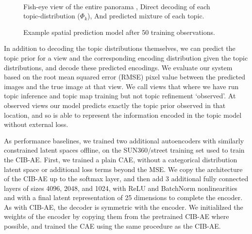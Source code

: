 \begin{figure}
{\begin{minipage}{0.6\textwidth}
{        } \\
    \end{minipage}
    }
    
    \caption{Example spatial prediction model after 50 training observations. \protect{}} Fish-eye view of the entire panorama \protect{}, Direct decoding of each topic-distribution ($\Phi_k$), And \protect{} predicted mixture of each topic.
    \label{fig:pano-2}
\end{figure}

In addition to decoding the topic distributions themselves, we can predict the topic prior for a view and the corresponding encoding distribution given the topic distributions, and decode these predicted encodings. We evaluate our system based on the root mean squared error (RMSE) pixel value between the predicted images and the true image at that view. We call views that where we have run topic inference and topic map training but not topic refinement `observed'. At observed views our model predicts exactly the topic prior observed in that location, and so is able to represent the information encoded in the topic model without external loss.

As performance baselines, we trained two additional autoencoders with similarly constrained latent spaces offline, on the SUN360/street training set used to train the CIB-AE. First, we trained a plain CAE, without a categorical distribution latent space or additional loss terms beyond the MSE. We copy the architecture of the CIB-AE up to the softmax layer, and then add 3 additional fully connected layers of sizes 4096, 2048, and 1024, with ReLU and BatchNorm nonlinearities and with a final latent representation of 25 dimensions to complete the encoder. As with CIB-AE, the decoder is symmetric with the encoder. We initialilzed the weights of the encoder by copying them from the pretrained CIB-AE where possible, and trained the CAE using the same procedure as the CIB-AE.

